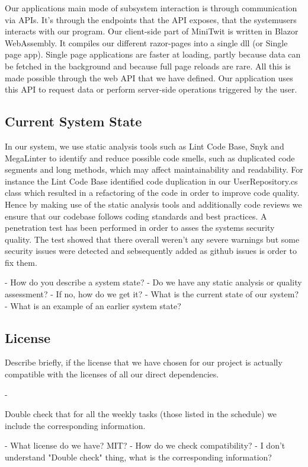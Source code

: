 Our applications main mode of subsystem interaction is through communication via APIs. It's through the endpoints that the API exposes, that the systemusers interacts with our program. Our client-side part of MiniTwit is written in Blazor WebAssembly. It compiles our different razor-pages into a single dll (or Single page app). Single page applications are faster at loading, partly because data can be fetched in the background and because full page reloads are rare. All this is made possible through the web API that we have defined. Our application uses this API to request data or perform server-side operations triggered by the user.  




\subsection{Current System State}

In our system, we use static analysis tools such as Lint Code Base, Snyk and MegaLinter to identify and reduce possible code smells, such as duplicated code segments and long methods, which may affect maintainability and readability. 
For instance the Lint Code Base identified code duplication in our UserRepository.cs class which resulted in a refactoring of the code in order to improve code quality. Hence by making use of the static analysis tools and additionally code reviews we ensure that our codebase follows coding standards and best practices.
A penetration test has been performed in order to asses the systems security quality. The test showed that there overall weren't any severe warnings but some security issues were detected and sebsequently added as github issues is order to fix them. 




- How do you describe a system state?
- Do we have any static analysis or quality assessment?
- If no, how do we get it?
- What is the current state of our system?
- What is an example of an earlier system state?

\subsection{License}
Describe briefly, if the license that we have chosen for our project is actually compatible with the licenses of all our direct dependencies. 

-

Double check that for all the weekly tasks (those listed in the schedule) we include the corresponding information.

- What license do we have? MIT?
- How do we check compatibility?
- I don't understand "Double check" thing, what is the corresponding information?